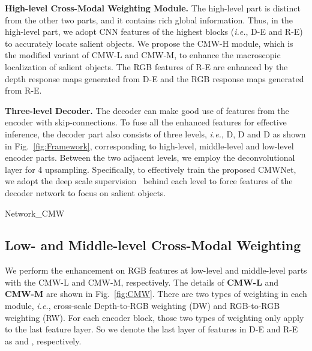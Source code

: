 \documentclass[runningheads]{llncs}
\newcommand{\ie}{\emph{i.e.}}
\begin{document}
\noindent\textbf{High-level Cross-Modal Weighting Module.}
The high-level part is distinct from the other two parts,
and it contains rich global information.
Thus, in the high-level part, we adopt CNN features of the highest blocks
(\ie, D-E and R-E)
to accurately locate salient objects.
We propose the CMW-H module, which is the modified variant of CMW-L and CMW-M,
to enhance the macroscopic localization of salient objects.
The RGB features of R-E are enhanced by the depth response maps generated from
D-E and the RGB response maps generated from R-E.



\noindent\textbf{Three-level Decoder.}
The decoder can make good use of features from the encoder
with skip-connections.
To fuse all the enhanced features for effective inference,
the decoder part also consists of three levels,
\ie, D, D and D as shown in Fig.~\ref{fig:Framework},
corresponding to high-level, middle-level and low-level encoder parts.
Between the two adjacent levels, we employ the deconvolutional layer
for 4 upsampling.
Specifically, to effectively train the proposed CMWNet, we adopt the deep scale
supervision~\cite{2015DeepSup} behind each level to force features of the decoder
network to focus on salient objects.



\begin{figure*}[t!]
	\centering
	\begin{overpic}[width=\textwidth]{Network_CMW}
    \end{overpic}
\caption{\small \textbf{Details of the three proposed RGB-depth interaction modules: CMW-L, CMW-M and CMW-H.}	
    All modules consist of Depth-to-RGB Weighting (DW) and RGB-to-RGB Weighting (RW) as key operations.
	Notably, the DW in CMW-L and CMW-M is performed in the cross-scale manner between two adjacent blocks, which effectively captures the feature continuity and activates cross-modal cross-scale interactions.
    }
\label{fig:CMW}
\end{figure*}




\subsection{Low- and Middle-level Cross-Modal Weighting}
\label{sec:CCW}

We perform the enhancement on RGB features at low-level and
middle-level parts with the CMW-L and CMW-M, respectively.
The details of \textbf{CMW-L} and \textbf{CMW-M} are shown
in Fig.~\ref{fig:CMW}.
There are two types of weighting in each module, \ie,
cross-scale Depth-to-RGB weighting (DW) and RGB-to-RGB weighting (RW).
For each encoder block, those two types of weighting
only apply to the last feature layer.
So we denote the last layer of features in D-E and R-E
as  and , respectively.
\end{document}
